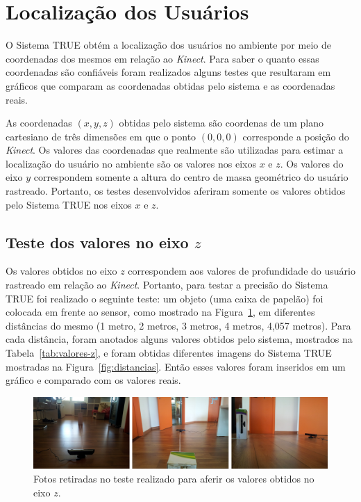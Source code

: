 \section{Localização dos Usuários}

O Sistema TRUE obtém a localização dos usuários no ambiente por meio de coordenadas dos mesmos em relação ao \textit{Kinect}. Para saber o quanto essas coordenadas são confiáveis foram realizados alguns testes que resultaram em gráficos que comparam as coordenadas obtidas pelo sistema e as coordenadas reais.

As coordenadas $\displaystyle (x, y, z)$ obtidas pelo sistema são coordenas de um plano cartesiano de três dimensões em que o ponto $\displaystyle (0, 0, 0)$ corresponde a posição do \textit{Kinect}. Os valores das coordenadas que realmente são utilizadas para estimar a localização do usuário no ambiente são os valores nos eixos $\displaystyle x$ e $\displaystyle z$. Os valores do eixo $\displaystyle y$ correspondem somente a altura do centro de massa geométrico do usuário rastreado. Portanto, os testes desenvolvidos aferiram somente os valores obtidos pelo Sistema TRUE nos eixos $\displaystyle x$ e $\displaystyle z$.

\subsection{Teste dos valores no eixo $\displaystyle z$}

	Os valores obtidos no eixo $\displaystyle z$ correspondem aos valores de profundidade do usuário rastreado em relação ao \textit{Kinect}. Portanto, para testar a precisão do Sistema TRUE foi realizado o seguinte teste: um objeto (uma caixa de papelão) foi colocada em frente ao sensor, como mostrado na Figura~\ref{fig:teste-z}, em diferentes distâncias do mesmo (1 metro, 2 metros, 3 metros, 4 metros, 4,057 metros). Para cada distância, foram anotados alguns valores obtidos pelo sistema, mostrados na Tabela~\ref{tab:valores-z}, e foram obtidas diferentes imagens do Sistema TRUE mostradas na Figura~\ref{fig:distancias}. Então esses valores foram inseridos em um gráfico e comparado com os valores reais.

	\begin{figure}[htb]
		\begin{center}
			\includegraphics[scale=0.35]{figuras/5.Testes/teste-eixoz.png}
		\end{center}
		\caption{Fotos retiradas no teste realizado para aferir os valores obtidos no eixo $\displaystyle z$.}
		\label{fig:teste-z}
	\end{figure}

